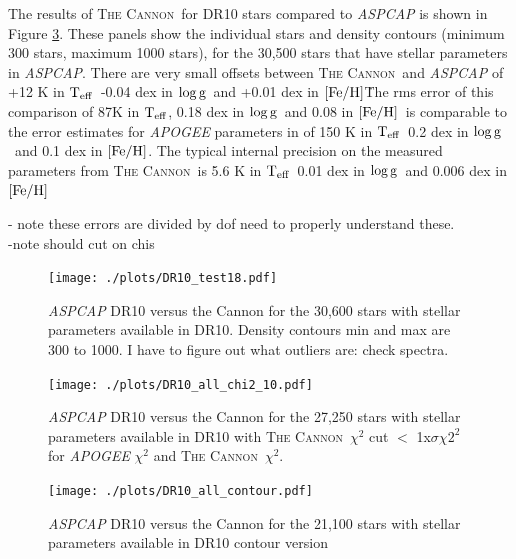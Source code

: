 \documentclass[12pt, preprint]{aastex}
\newcommand{\teff}{\mbox{$\rm T_{eff}$}}
\newcommand{\feh}{\mbox{$\rm [Fe/H]$}}
\newcommand{\logg}{\mbox{$\rm \log g$}}
\newcommand{\tc}{\textsc{The Cannon}}
\begin{document}
The results of \tc\ for DR10 stars compared to \textit{ASPCAP} is shown in Figure \ref{fig:DR10_compare}. These panels show the individual stars and density contours  (minimum 300 stars, maximum 1000 stars), for the 30,500 stars that have stellar parameters in \textit{ASPCAP}. There are very small offsets between \tc\ and \textit{ASPCAP} of +12 K in \teff\, -0.04 dex in \logg\ and +0.01 dex in \feh\. The rms error of this comparison of 87K in \teff, 0.18 dex in \logg\ and 0.08 in \feh\ is comparable to the error estimates for \textit{APOGEE} parameters in \citet{Meszaros2013} of 150 K in \teff\, 0.2 dex in \logg\ and 0.1 dex in \feh.  The typical internal precision on the measured parameters from \tc\ is 5.6 K in \teff\, 0.01 dex in \logg\ and 0.006 dex in \feh\ 

- note these errors are divided by dof need to properly understand these. \\

-note should cut on chis


\begin{figure}[h!]
\centering
        \texttt{[image: ./plots/DR10\_test18.pdf]} \\
\caption{\small{\textit{ASPCAP} DR10 versus the Cannon for the 30,600 stars with stellar parameters available in DR10. Density contours min and max are 300 to 1000. I have to figure out what outliers are: check spectra.}}
\label{fig:DR10_compare}
\end{figure}


\begin{figure}[h!]
\centering
        \texttt{[image: ./plots/DR10\_all\_chi2\_10.pdf]} \\
\caption{\small{\textit{ASPCAP} DR10 versus the Cannon for the 27,250 stars with stellar parameters available in DR10 with \tc\ $\chi^2$ cut $<$ 1x$\sigma \chi2^2$ for \textit{APOGEE} $\chi^2$ and \tc\ $\chi^2$.}}
\label{fig:DR10_compare}
\end{figure}


\begin{figure}[h!]
\centering
        \texttt{[image: ./plots/DR10\_all\_contour.pdf]} \\
\caption{\small{\textit{ASPCAP} DR10 versus the Cannon for the 21,100 stars with stellar parameters available in DR10 contour version}}
\label{fig:DR10_compare}
\end{figure}
\end{document}
